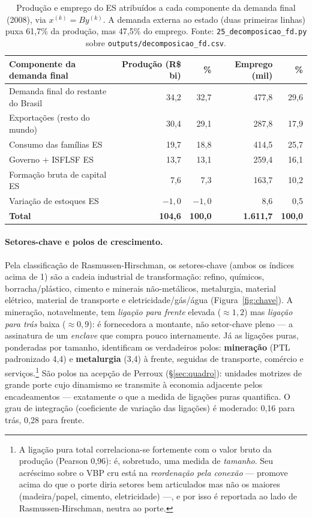 \documentclass[11pt,a4paper]{article}
\begin{document}
\begin{table}[tbp]
\centering\small
\begin{tabular}{lrrrr}
\toprule
Componente da demanda final & Produção (R\$ bi) & \% & Emprego (mil) & \% \\
\midrule
Demanda final do restante do Brasil & 34,2 & 32,7 & 477,8 & 29,6 \\
Exportações (resto do mundo) & 30,4 & 29,1 & 287,8 & 17,9 \\
Consumo das famílias ES & 19,7 & 18,8 & 414,5 & 25,7 \\
Governo + ISFLSF ES & 13,7 & 13,1 & 259,4 & 16,1 \\
Formação bruta de capital ES & 7,6 & 7,3 & 163,7 & 10,2 \\
Variação de estoques ES & $-1,0$ & $-1,0$ & 8,6 & 0,5 \\
\midrule
\textbf{Total} & \textbf{104,6} & \textbf{100,0} & \textbf{1.611,7} & \textbf{100,0} \\
\bottomrule
\end{tabular}
\caption{Produção e emprego do ES atribuídos a cada componente da demanda final
(2008), via $x^{(k)}=By^{(k)}$. A demanda externa ao estado (duas primeiras linhas)
puxa 61,7\% da produção, mas 47,5\% do emprego. Fonte: \texttt{25\_decomposicao\_fd.py}
sobre \texttt{outputs/decomposicao\_fd.csv}.}
\label{tab:decomp}
\end{table}

\paragraph{Setores-chave e polos de crescimento.}
Pela classificação de Rasmussen-Hirschman, os setores-chave (ambos os índices acima de
1) são a cadeia industrial de transformação: refino, químicos, borracha/plástico,
cimento e minerais não-metálicos, metalurgia, material elétrico, material de transporte
e eletricidade/gás/água (Figura~\ref{fig:chave}). A mineração, notavelmente, tem
\emph{ligação para frente} elevada ($\approx1{,}2$) mas \emph{ligação para trás}
baixa ($\approx0{,}9$): é fornecedora a montante, não setor-chave pleno --- a
assinatura de um \emph{enclave} que compra pouco internamente. Já as ligações puras,
ponderadas por tamanho, identificam os verdadeiros polos: \textbf{mineração}
($\mathrm{PTL}$ padronizado 4,4) e \textbf{metalurgia} (3,4) à frente, seguidas de
transporte, comércio e serviços.\footnote{A ligação pura total correlaciona-se fortemente
com o valor bruto da produção (Pearson 0,96): é, sobretudo, uma medida de \emph{tamanho}.
Seu acréscimo sobre o VBP cru está na \emph{reordenação pela conexão} --- promove acima do
que o porte diria setores bem articulados mas não os maiores (madeira/papel, cimento,
eletricidade) ---, e por isso é reportada ao lado de Rasmussen-Hirschman, neutra ao porte.}
São polos na acepção de Perroux  (\S\ref{sec:quadro}): unidades motrizes de grande porte cujo dinamismo se transmite à economia adjacente pelos encadeamentos --- exatamente o que a medida de ligações puras quantifica. O grau de integração (coeficiente de variação das ligações) é moderado: 0,16 para trás, 0,28 para frente.
\end{document}
